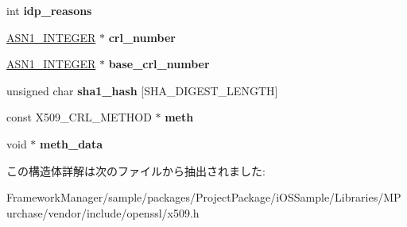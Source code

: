\begin{DoxyCompactItemize}
\item 
\hypertarget{struct_x509__crl__st_a1e5c7e949f238d6937a45ff6e57738b9}{}int {\bfseries idp\+\_\+reasons}\label{struct_x509__crl__st_a1e5c7e949f238d6937a45ff6e57738b9}

\item 
\hypertarget{struct_x509__crl__st_a38d84a6c190dc370d74e145cd4faa8d4}{}\hyperlink{structasn1__string__st}{A\+S\+N1\+\_\+\+I\+N\+T\+E\+G\+E\+R} $\ast$ {\bfseries crl\+\_\+number}\label{struct_x509__crl__st_a38d84a6c190dc370d74e145cd4faa8d4}

\item 
\hypertarget{struct_x509__crl__st_a758731f9f2c7efcbf2d7e8c6e0b01278}{}\hyperlink{structasn1__string__st}{A\+S\+N1\+\_\+\+I\+N\+T\+E\+G\+E\+R} $\ast$ {\bfseries base\+\_\+crl\+\_\+number}\label{struct_x509__crl__st_a758731f9f2c7efcbf2d7e8c6e0b01278}

\item 
\hypertarget{struct_x509__crl__st_a1040792ec929f92137cb677e58cc8e94}{}unsigned char {\bfseries sha1\+\_\+hash} \mbox{[}S\+H\+A\+\_\+\+D\+I\+G\+E\+S\+T\+\_\+\+L\+E\+N\+G\+T\+H\mbox{]}\label{struct_x509__crl__st_a1040792ec929f92137cb677e58cc8e94}

\item 
\hypertarget{struct_x509__crl__st_a7fbfb8e62320e2a6275153c832c2ccd5}{}const X509\+\_\+\+C\+R\+L\+\_\+\+M\+E\+T\+H\+O\+D $\ast$ {\bfseries meth}\label{struct_x509__crl__st_a7fbfb8e62320e2a6275153c832c2ccd5}

\item 
\hypertarget{struct_x509__crl__st_a409391d6ea1a661d0c27c84e26b9676b}{}void $\ast$ {\bfseries meth\+\_\+data}\label{struct_x509__crl__st_a409391d6ea1a661d0c27c84e26b9676b}

\end{DoxyCompactItemize}


この構造体詳解は次のファイルから抽出されました\+:\begin{DoxyCompactItemize}
\item 
Framework\+Manager/sample/packages/\+Project\+Package/i\+O\+S\+Sample/\+Libraries/\+M\+Purchase/vendor/include/openssl/x509.\+h\end{DoxyCompactItemize}

